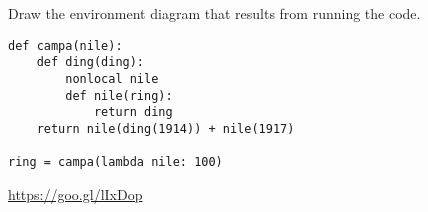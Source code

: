 \begin{blocksection}
\question Draw the environment diagram that results from running the code.

\begin{lstlisting}
def campa(nile):
    def ding(ding):
        nonlocal nile
        def nile(ring):
            return ding
    return nile(ding(1914)) + nile(1917)

ring = campa(lambda nile: 100)
\end{lstlisting}

\begin{solution}[1in]
\url{https://goo.gl/lIxDop}
\end{solution}
\end{blocksection}
